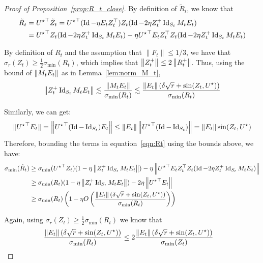 \begin{proof}[Proof of Proposition~\ref{prop:R_t_close}]
By definition of $\tilde{R}_t$, we know that 
\begin{align}
\tilde{R}_t &= {{U}^\star}^{\top} \tilde{Z}_t = {{U}^\star}^{\top}(\operatorname{Id} -  \eta E_t Z_t^{\top})Z_t ( \operatorname{Id} -  2 \eta Z_t^{+} \operatorname{Id}_{S_t} M_t E_t )\nonumber
\\
&= {{U}^\star}^{\top}Z_t ( \operatorname{Id} -  2 \eta Z_t^{+} \operatorname{Id}_{S_t} M_t E_t ) -   \eta {{U}^\star}^{\top} E_t Z_t^{\top} Z_t ( \operatorname{Id} -  2 \eta Z_t^{+} \operatorname{Id}_{S_t} M_t E_t ) \label{eqn:Rt}
\end{align}


By definition of $R_t$ and the assumption that $\| F_t \| \leq 1/3$, we have that $\sigma_{r}(Z_t) \geq \frac{1}{2} \sigma_{\min} (R_t)$, which implies that $\left\|Z_t^+\right\| \leq 2 \left\|R_t^+\right\|$. Thus,
using the bound of $\left\|M_t E_t\right\|$ as in Lemma~\ref{lem:norm_M_t},
\begin{align}
\left\|Z_t^{+} \operatorname{Id}_{S_t} M_t E_t \right\| \lesssim \frac{\left\| M_t E_t\right\| }{\sigma_{\min}(R_t)} \lesssim \frac{\left\|E_t\right\| (\delta \sqrt{r} + \sin(Z_t, {{U}^\star}))}{\sigma_{\min}(R_t)}\nonumber
\end{align}


Similarly, we can get: 
\begin{align}
\|{{U}^\star}^{\top}E_t \| = \left\|{{U}^\star}^{\top}(\operatorname{Id} - \operatorname{Id}_{S_t})E_t \right\|  \leq \left\|E_t\right\| \left\|{{U}^\star}^{\top}(\operatorname{Id} - \operatorname{Id}_{S_t})\right\| =  \left\|E_t\right\|  \sin(Z_t, {{U}^\star})\label{eq:12345afjosji}
\end{align}
Therefore, bounding the terms in equation~\eqref{eqn:Rt} using the bounds above, we have:
\begin{align}
\sigma_{\min}(\tilde{R}_t ) &\geq \sigma_{\min}({{U}^\star}^{\top}Z_t) (1 - \eta \left\| Z_t^{+} \operatorname{Id}_{S_t} M_t E_t\right\|) - \eta \left\| {{U}^\star}^{\top} E_t Z_t^{\top} Z_t ( \operatorname{Id} -  2 \eta Z_t^{+} \operatorname{Id}_{S_t} M_t E_t )\right\|\nonumber
\\
& \geq \sigma_{\min}(R_t)  (1 - \eta \left\| Z_t^{+} \operatorname{Id}_{S_t} M_t E_t\right\|) - 2\eta \left\|{{U}^\star}^{\top} E_t\right\|\nonumber
\\
& \geq \sigma_{\min}(R_t)\left( 1 - \eta O\left(  \frac{\left\|E_t\right\| (\delta \sqrt{r} + \sin(Z_t, {{U}^\star}))}{\sigma_{\min}(R_t)} \right) \right) \label{eqn:201_rel}
\end{align}


Again, using $\sigma_{r}(Z_t) \geq \frac{1}{2} \sigma_{\min} (R_t)$ we know that 
\begin{align}
\frac{\left\|E_t\right\| (\delta \sqrt{r} + \sin(Z_t, {{U}^\star}))}{\sigma_{\min}(R_t)} &\leq 2\frac{\left\|E_t\right\| (\delta \sqrt{r} + \sin(Z_t, {{U}^\star}))}{\sigma_{\min}(Z_t)}\nonumber
\end{align}


\end{proof}
